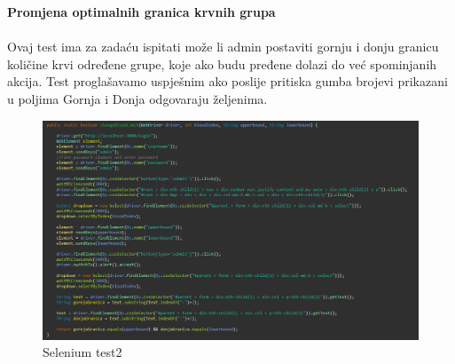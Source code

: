 \textbf{Promjena optimalnih granica krvnih grupa}	
\\\\
Ovaj test ima za zadaću ispitati može li admin postaviti gornju i donju granicu količine krvi određene grupe, koje ako budu pređene dolazi do već spominjanih akcija. Test proglašavamo uspješnim ako poslije pritiska gumba brojevi prikazani u poljima Gornja i Donja odgovaraju željenima.
\eject
\begin{figure}[H]
	\centering
	\includegraphics[width=\textwidth, scale=0.5]{slike/selenium2}
	\caption{Selenium test2}
\end{figure}

